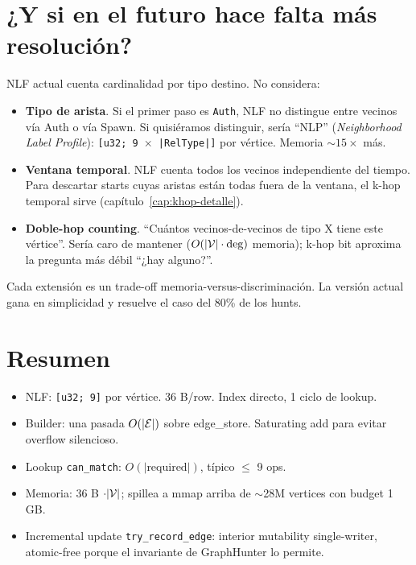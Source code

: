 \section{¿Y si en el futuro hace falta más resolución?}

NLF actual cuenta cardinalidad por tipo destino. No considera:

\begin{itemize}
    \item \textbf{Tipo de arista}. Si el primer paso es
    \texttt{Auth}, NLF no distingue entre vecinos vía Auth o vía
    Spawn. Si quisiéramos distinguir, sería ``NLP''
    (\emph{Neighborhood Label Profile}): \texttt{[u32; 9 \(\times\) |RelType|]}
    por vértice. Memoria \(\sim 15\times\) más.
    \item \textbf{Ventana temporal}. NLF cuenta todos los vecinos
    independiente del tiempo. Para descartar starts cuyas aristas
    están todas fuera de la ventana, el k-hop temporal sirve
    (capítulo~\ref{cap:khop-detalle}).
    \item \textbf{Doble-hop counting}. ``Cuántos vecinos-de-vecinos
    de tipo X tiene este vértice''. Sería caro de mantener
    (\(O(|\mathcal{V}| \cdot \deg)\) memoria); k-hop bit aproxima la
    pregunta más débil ``¿hay alguno?''.
\end{itemize}

\noindent
Cada extensión es un trade-off memoria-versus-discriminación. La
versión actual gana en simplicidad y resuelve el caso del 80\% de
los hunts.

\section{Resumen}

\begin{itemize}
    \item NLF: \texttt{[u32; 9]} por vértice. 36 B/row. Index
    directo, 1 ciclo de lookup.
    \item Builder: una pasada \(O(|\mathcal{E}|)\) sobre edge\_store.
    Saturating add para evitar overflow silencioso.
    \item Lookup \texttt{can\_match}: \(O(|\text{required}|)\),
    típico $\leq$ 9 ops.
    \item Memoria: 36 B \(\cdot |\mathcal{V}|\); spillea a mmap arriba de
    $\sim$28M vertices con budget 1 GB.
    \item Incremental update \texttt{try\_record\_edge}: interior
    mutability single-writer, atomic-free porque el invariante de
    GraphHunter lo permite.
\end{itemize}

